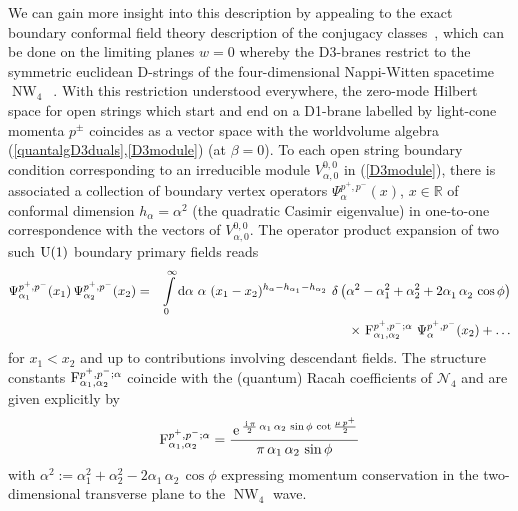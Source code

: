 \documentclass[11pt,a4paper]{article}
\DeclareMathOperator{\NW}{NW}
\newcommand{\ii}{{\rm i}}
\def\ii{{\,{\rm i}\,}}
\def\dd{{\rm d}}
\newcommand{\real}{{\mathbb R}} %
\def\nn{\nonumber}
\def\e{{\,\rm e}\,}
\def\bea{\begin{eqnarray}}
\def\eea{\end{eqnarray}}
\newcommand{\beq}{\begin{eqnarray}}
\newcommand{\eeq}{\end{eqnarray}}
\begin{document}
We can gain more insight into this description by appealing to the
exact boundary conformal field theory description of the conjugacy
classes~\cite{DK2,Hikida1}, which can be done on the limiting planes
$w=0$ whereby the D3-branes restrict to the symmetric euclidean
D-strings of the four-dimensional Nappi-Witten spacetime
$\NW_4$~\cite{FS1}. With this restriction understood everywhere, the
zero-mode Hilbert space for open strings which start and end on a
D1-brane labelled by light-cone momenta $p^\pm$ coincides as a vector
space with the worldvolume algebra
(\ref{quantalgD3duals},\ref{D3module}) (at $\beta=0$). To each open
string boundary condition corresponding to an irreducible module
$V_{\alpha,0}^{0,0}$ in (\ref{D3module}), there is associated a
collection of boundary vertex operators $\Psi_\alpha^{p^+,p^-}(x)$,
$x\in\real$ of conformal dimension $h_\alpha=\alpha^2$ (the quadratic
Casimir eigenvalue) in one-to-one correspondence with the vectors of
$V_{\alpha,0}^{0,0}$. The operator product expansion of two such ${\rm
  U}(1)$ boundary primary fields reads~\cite{DK2}
\bea
\Psi_{\alpha_1}^{p^+,p^-}(x_1)\,\Psi_{\alpha_2}^{p^+,p^-}(x_2)&=&
\int\limits_0^\infty\dd\alpha~\alpha~(x_1-x_2)^{h_\alpha-
h_{\alpha_1}-h_{\alpha_2}}~\delta\left(\alpha^2-
\alpha_1^2+\alpha_2^2+2\alpha^{~}_1\,\alpha^{~}_2\,\cos\phi\right)
\nn\\ &&\times~ {\rm F}^{p^+,p^-;\alpha}_{\alpha_1,\alpha_2}~
\Psi_{\alpha}^{p^+,p^-}(x_2)+\dots
\label{OPEbdryfields}\eea
for $x_1<x_2$ and up to contributions involving descendant fields. The
structure constants ${\rm F}^{p^+,p^-;\alpha}_{\alpha_1,\alpha_2}$
coincide with the (quantum) Racah coefficients of $\mathcal{N}_4$ and
are given explicitly by
\beq
{\rm F}^{p^+,p^-;\alpha}_{\alpha_1,\alpha_2}=\frac{\e^{\frac{\ii\pi}2\,
\alpha_1\,\alpha_2\,\sin\phi\,\cot\frac{\mu\,p^+}2}}{
\pi\,\alpha_1\,\alpha_2\,\sin\phi}
\label{Racahquantum}\eeq
with
$\alpha^2:=\alpha_1^2+\alpha_2^2-2\alpha^{~}_1\,\alpha^{~}_2\,\cos\phi$
expressing momentum conservation in the two-dimensional transverse
plane to the $\NW_4$ wave.
\end{document}
